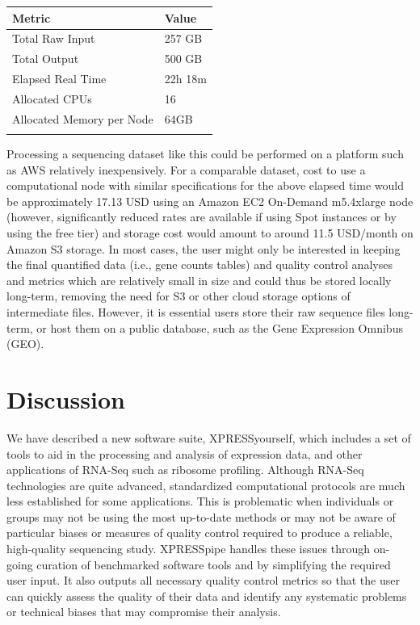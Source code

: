 \documentclass[10pt, oneside]{article}
\begin{document}
\begin{table}[!]
    \centering
{}
\begin{tabular}{p{5cm}p{3cm}}
\textbf{Metric} & \textbf{Value} \\
 \hline
 Total Raw Input & 257 GB \\
 \hline
 Total Output & 500 GB \\
 \hline
 Elapsed Real Time & 22h 18m \\
 \hline
 Allocated CPUs & 16 \\
 \hline
 Allocated Memory per Node & 64GB \\
 \label{tab:chpc_performance}
\end{tabular}
\end{table}

Processing a sequencing dataset like this could be performed on a platform such as AWS relatively inexpensively. For a comparable dataset, cost to use a computational node with similar specifications for the above elapsed time would be approximately 17.13 USD using an Amazon EC2 On-Demand m5.4xlarge node (however, significantly reduced rates are available if using Spot instances or by using the free tier) and storage cost would amount to around 11.5 USD/month on Amazon S3 storage. In most cases, the user might only be interested in keeping the final quantified data (i.e., gene counts tables) and quality control analyses and metrics which are relatively small in size and could thus be stored locally long-term, removing the need for S3 or other cloud storage options of intermediate files. However, it is essential users store their raw sequence files long-term, or host them on a public database, such as the Gene Expression Omnibus (GEO). \par


\section{Discussion}
We have described a new software suite, XPRESSyourself, which includes a set of tools to aid in the processing and analysis of expression data, and other applications of RNA-Seq such as ribosome profiling. Although RNA-Seq technologies are quite advanced, standardized computational protocols are much less established for some applications. This is problematic when individuals or groups may not be using the most up-to-date methods or may not be aware of particular biases or measures of quality control required to produce a reliable, high-quality sequencing study. XPRESSpipe handles these issues through on-going curation of benchmarked software tools and by simplifying the required user input. It also outputs all necessary quality control metrics so that the user can quickly assess the quality of their data and identify any systematic problems or technical biases that may compromise their analysis. \par
\end{document}
